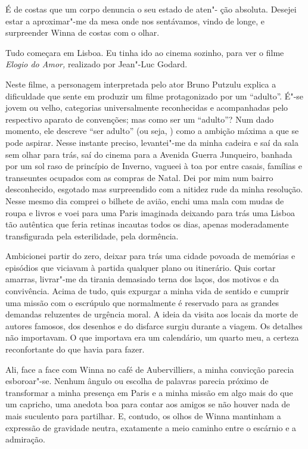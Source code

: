 É de costas que um corpo denuncia o seu estado de aten"- ção absoluta.
Desejei estar a aproximar"-me da mesa onde nos sentávamos, vindo de
longe, e surpreender Winna de costas com o olhar.

Tudo começara em Lisboa. Eu tinha ido ao cinema sozinho, para ver o
filme \emph{Elogio do Amor, }realizado por Jean"-Luc Godard.

Neste filme, a personagem interpretada pelo ator Bruno Putzulu explica
a dificuldade que sente em produzir um filme protagonizado por um
``adulto''. É"-se jovem ou velho, categorias universalmente
reconhecidas e acompanhadas pelo respectivo aparato de convenções; mas
como ser um ``adulto''? Num dado momento, ele descreve ``ser adulto''
(ou seja, ) como a ambição máxima a que se pode aspirar. Nesse
instante preciso, levantei"-me da minha cadeira e saí da sala sem olhar
para trás, saí do cinema para a Avenida Guerra Junqueiro, banhada por
um sol raso de princípio de Inverno, vagueei à toa por entre casais,
famílias e transeuntes ocupados com as compras de Natal. Dei por mim num
bairro desconhecido, esgotado mas surpreendido com a nitidez rude da
minha resolução. Nesse mesmo dia comprei o bilhete de avião, enchi uma
mala com mudas de roupa e livros e voei para uma Paris imaginada
deixando para trás uma Lisboa tão autêntica que feria retinas incautas
todos os dias, apenas moderadamente transfigurada pela esterilidade,
pela dormência.

Ambicionei partir do zero, deixar para trás uma cidade povoada de
memórias e episódios que viciavam à partida qualquer plano ou
itinerário. Quis cortar amarras, livrar"-me da tirania demasiado terna
dos laços, dos motivos e da convivência. Acima de tudo, quis expurgar
a minha vida de sentido e cumprir uma missão com o escrúpulo que
normalmente é reservado para as grandes demandas reluzentes de urgência
moral. A ideia da visita aos locais da morte de autores famosos, dos
desenhos e do disfarce surgiu durante a viagem. Os detalhes não
importavam. O que importava era um calendário, um quarto meu, a
certeza reconfortante do que havia para fazer.

Ali, face a face com Winna no café de Aubervilliers, a
minha convicção parecia esboroar"-se. Nenhum ângulo ou escolha de
palavras parecia próximo de transformar a minha presença em Paris e a
minha missão em algo mais do que um capricho, uma anedota boa para
contar aos amigos se não houver nada de mais suculento para partilhar.
E, contudo, os olhos de Winna mantinham a expressão de gravidade neutra,
exatamente a meio caminho entre o escárnio e a admiração.

